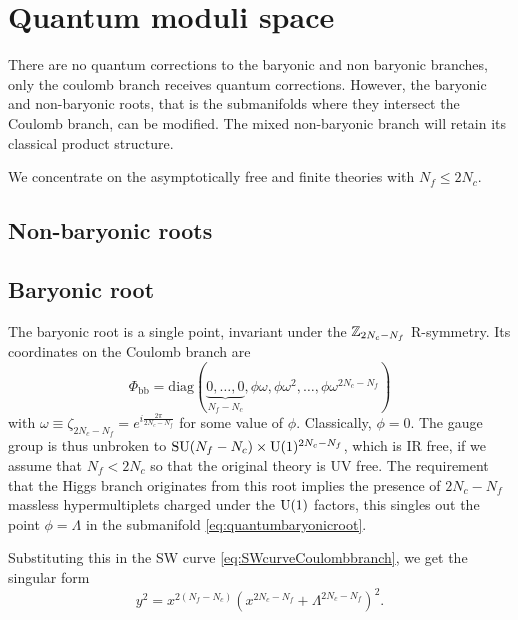 \section{Quantum moduli space}\label{secquantummodulispaceSU}

    There are no quantum corrections to the baryonic and non baryonic branches, only the coulomb branch receives quantum corrections. However, the baryonic and non-baryonic roots, that is the submanifolds where they intersect the Coulomb branch, can be modified. The mixed non-baryonic branch will retain its classical product structure.

    We concentrate on the asymptotically free and finite theories with $N_f\leq2N_c$.

    \subsection{Non-baryonic roots}

        

    \subsection{Baryonic root}

        The baryonic root is a single point, invariant under the $\mathbb{Z}_{2N_c-N_f}$ R-symmetry. Its coordinates on the Coulomb branch are
        \begin{equation}
            \Phi_{\text{bb}}=\text{diag}(\underbrace{0,\dots,0}_{N_f-N_c},\phi\omega,\phi\omega^2,\dots,\phi\omega^{2N_c-N_f})\label{eq:quantumbaryonicroot}
        \end{equation}
        with $\omega\equiv\zeta_{2N_c-N_f}=e^{i\frac{2\pi}{2N_c-N_f}}$ for some value of $\phi$. Classically, $\phi=0$. The gauge group is thus unbroken to $\text{SU}(N_f-N_c)\times\text{U}(1)^{2N_c-N_f}$, which is IR free, if we assume that $N_f<2N_c$ so that the original theory is UV free. The requirement that the Higgs branch originates from this root implies the presence of $2N_c-N_f$ massless hypermultiplets charged under the $\text{U}(1)$ factors, this singles out the point $\phi=\Lambda$ in the submanifold \eqref{eq:quantumbaryonicroot}.

        Substituting this in the SW curve \eqref{eq:SWcurveCoulombbranch}, we get the singular form
        \begin{equation}
            y^2=x^{2(N_f-N_c)}(x^{2N_c-N_f}+\Lambda^{2N_c-N_f})^2.
        \end{equation}

